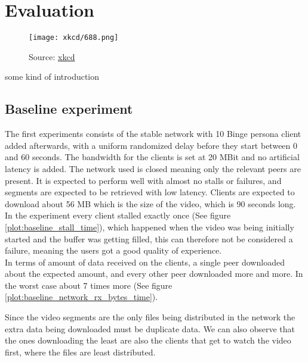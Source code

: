 \chapter{Evaluation}
\label{cha:evaluation}
\begin{figure}[ht]
    \centering
    \texttt{[image: xkcd/688.png]}
    \caption*{Source: \href{https://xkcd.com/688/}{xkcd}}
\end{figure}


some kind of introduction


\section{Baseline experiment}    
The first experiments consists of the stable network with 10 Binge persona client added afterwards, with a uniform randomized delay before they start between 0 and 60 seconds. The bandwidth for the clients is set at 20 \acs{MBit} and no artificial latency is added. The network used is closed meaning only the relevant peers are present. It is expected to perform well with almost no stalls or failures, and segments are expected to be retrieved with low latency. Clients are expected to download about 56 \acs{MB} which is the size of the video, which is 90 seconds long. \\
In the experiment every client stalled exactly once (See figure \ref{plot:baseline_stall_time}), which happened when the video was being initially started and the buffer was getting filled, this can therefore not be considered a failure, meaning the users got a good quality of experience.\\ 



In terms of amount of data received on the clients, a single peer downloaded about the expected amount, and every other peer downloaded more and more. In the worst case about 7 times more (See figure \ref{plot:baseline_network_rx_bytes_time}).



Since the video segments are the only files being distributed in the network the extra data being downloaded must be duplicate data. We can also observe that the ones downloading the least are also the clients that get to watch the video first, where the files are least distributed.\\ 

